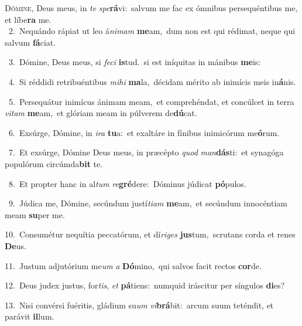 \lettrine{\initial\textcolor{\initialcolor}{D}}{ómine,} Deus meus, in \textit{te} \textit{spe}\-\textbf{rá}vi:~\star salvum me fac ex ómnibus persequéntibus me, et líbe\textbf{ra} me.\\
{\numbfont\textcolor{\numbcolor}{~2.}}~Nequándo rápiat ut leo á\-\textit{ni}\-\textit{mam} \textbf{me}\-am,~\star dum non est qui rédimat, neque qui salvum \textbf{fá}\-ciat.\par
{\numbfont\textcolor{\numbcolor}{~3.}}~Dómine, Deus meus, si \textit{fe}\-\textit{ci} \textbf{is}\-tud.~\star si est iníquitas in mánibus \textbf{me}\-is:\par
{\numbfont\textcolor{\numbcolor}{~4.}}~Si réddidi retribuéntibus \textit{mi}\-\textit{hi} \textbf{ma}\-la,~\star décidam mérito ab inimícis meis in\-\textbf{á}\-nis.\par
{\numbfont\textcolor{\numbcolor}{~5.}}~Persequátur inimícus ánimam meam,~\dagger et comprehéndat, et concúlcet in terra \textit{vi}\-\textit{tam} \textbf{me}\-am,~\star et glóriam meam in púlverem de\-\textbf{dú}\-cat.\par
{\numbfont\textcolor{\numbcolor}{~6.}}~Exsúrge, Dómine, in \textit{i}\-\textit{ra} \textbf{tu}\-a:~\star et exaltáre in fínibus inimicórum me\-\textbf{ó}\-rum.\par
{\numbfont\textcolor{\numbcolor}{~7.}}~Et exsúrge, Dómine Deus meus, in præcépto \textit{quod} \textit{man}\-\textbf{dás}ti:~\star et synagóga populórum circúmda\textbf{bit} te.\par
{\numbfont\textcolor{\numbcolor}{~8.}}~Et propter hanc in al\textit{tum} \textit{re}\-\textbf{gré}dere:~\star Dóminus júdicat \textbf{pó}\-pulos.\par
{\numbfont\textcolor{\numbcolor}{~9.}}~Júdica me, Dómine, secúndum justí\-\textit{ti}\-\textit{am} \textbf{me}\-am,~\star et secúndum innocéntiam meam \textbf{su}\-per me.\par
{\numbfont\textcolor{\numbcolor}{10.}}~Consumétur nequítia peccatórum, et dí\-\textit{ri}\-\textit{ges} \textbf{jus}\-tum,~\star scrutans corda et renes \textbf{De}\-us.\par
{\numbfont\textcolor{\numbcolor}{11.}}~Justum adjutórium me\textit{um} \textit{a} \textbf{Dó}\-mino,~\star qui salvos facit rectos \textbf{cor}\-de.\par
{\numbfont\textcolor{\numbcolor}{12.}}~Deus judex justus, for\-\textit{tis}\-, \textit{et} \textbf{pá}\-tiens:~\star numquid iráscitur per síngulos \textbf{di}\-es?\par
{\numbfont\textcolor{\numbcolor}{13.}}~Nisi convérsi fuéritis, gládium su\textit{um} \textit{vi}\-\textbf{brá}bit:~\star arcum suum teténdit, et parávit \textbf{il}\-lum.\par
